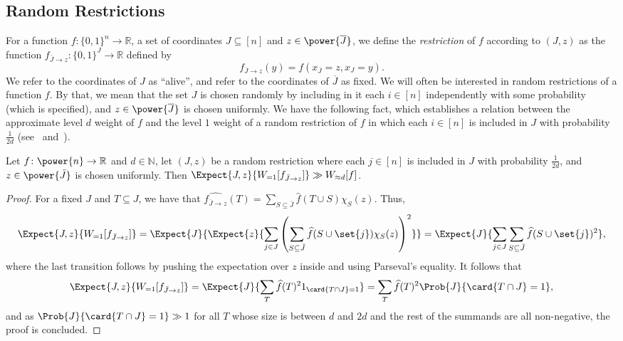 \subsection{Random Restrictions}
For a function $f\colon\{0,1\}^n\to\mathbb{R}$, a set of coordinates $J\subseteq[n]$ and $z\in\power{\overline{J}}$, we define the
\emph{restriction} of
$f$ according to $(J,z)$ as the function $f_{\overline{J}\rightarrow z}\colon \{0,1\}^{J}\to\mathbb{R}$ defined by
\[
f_{\overline{J}\rightarrow z}(y) = f(x_{\overline{J}} = z, x_{J} = y).
\]
We refer to the coordinates of $J$ as ``alive'', and refer to the coordinates of $\overline{J}$ as fixed.
We will often be interested in random restrictions of a function $f$. By that, we mean that the set $J$ is chosen randomly by including in it each
$i\in[n]$ independently with some probability (which is specified), and $z\in\power{\overline{J}}$ is chosen uniformly.
We have the following fact, which establishes a relation between
the approximate level $d$ weight of $f$ and the level $1$ weight of a random restriction of $f$ in which each $i\in [n]$ is included in $J$ with probability
$\frac{1}{2d}$ (see~\cite[Fact 4.1]{kindler2018gaussian} and~\cite[Section 3.1]{KKKMS}).
\begin{fact}\label{fact:restriction}
  Let $f\colon\power{n}\to\mathbb{R}$ and $d\in\mathbb{N}$, let $(J,z)$ be a random restriction
  where each $j\in [n]$ is included in $J$ with probability $\frac{1}{2d}$, and $z\in\power{\bar{J}}$ is chosen uniformly. Then $\Expect{J,z}{W_{=1}[f_{\bar{J}\rightarrow z}]}\gg W_{\approx d}[f]$.
\end{fact}
\begin{proof}
  For a fixed $J$ and $T\subseteq J$, we have that
  $\widehat{f_{\bar{J}\rightarrow z}}(T) = \sum\limits_{S\subseteq \bar{J}}\widehat{f}(T\cup S)\chi_S(z)$. Thus,
  \[
  \Expect{J,z}{W_{=1}[f_{\bar{J}\rightarrow z}]}
  =\Expect{J}{\Expect{z}{\sum\limits_{j\in J}\left(\sum\limits_{S\subseteq\bar{J}}\widehat{f}(S\cup \set{j})\chi_S(z)\right)^2}}
  =\Expect{J}{\sum\limits_{j\in J}\sum\limits_{S\subseteq\bar{J}}\widehat{f}(S\cup \set{j})^2},
  \]
  where the last transition follows by pushing the expectation over $z$ inside and using Parseval's equality. It follows that
  \[
  \Expect{J,z}{W_{=1}[f_{\bar{J}\rightarrow z}]} =
  \Expect{J}{\sum\limits_{T}\widehat{f}(T)^21_{\card{T\cap J} = 1}}
  =\sum\limits_{T}\widehat{f}(T)^2\Prob{J}{\card{T\cap J}=1},
  \]
  and as $\Prob{J}{\card{T\cap J}=1}\gg 1$ for all $T$ whose size is between $d$ and $2d$ and the rest of the summands
  are all non-negative, the proof is concluded.
\end{proof}

